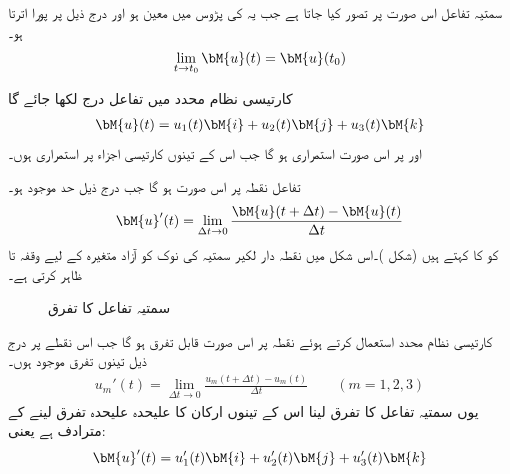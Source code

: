 سمتیہ  تفاعل  اس صورت  پر  تصور کیا جاتا ہے جب یہ  کی پڑوس میں معین ہو اور درج ذیل پر پورا اترتا ہو۔
\begin{align}
\lim_{t\to t_0} \bM{u}(t)=\bM{u}(t_0)
\end{align}

کارتیسی نظام محدد میں تفاعل  درج لکھا جائے گا
\begin{align}
\bM{u}(t)=u_1(t)\bM{i}+u_2(t)\bM{j}+u_3(t)\bM{k}
\end{align}
اور  پر  اس صورت استمراری ہو گا جب اس کے تینوں کارتیسی اجزاء  پر استمراری ہوں۔

تفاعل  نقطہ  پر اس صورت  ہو گا جب  درج ذیل حد موجود ہو۔
\begin{align}
\bM{u}'(t)=\lim_{\Delta t\to 0} \frac{\bM{u}(t+\Delta t)-\bM{u}(t)}{\Delta t}
\end{align}
 کو  کا  کہتے ہیں (شکل )۔اس شکل  میں نقطہ دار لکیر سمتیہ  کی نوک کو  آزاد متغیرہ  کے لیے وقفہ     تا  ظاہر کرتی ہے۔
\begin{figure}
\centering
{}
\caption{سمتیہ  تفاعل کا تفرق}
\label{شکل_الاحصاء_سمتی_تفاعل_تفرق}
\end{figure}

کارتیسی نظام محدد استعمال کرتے ہوئے نقطہ   پر  اس صورت قابل تفرق ہو گا جب اس نقطے پر درج ذیل تینوں تفرق موجود ہوں۔
\begin{align*}
u_m'(t)=\lim_{\Delta t\to 0}\frac{u_m(t+\Delta t)-u_m(t)}{\Delta t} \quad \quad (m=1,2,3)
\end{align*}
یوں سمتیہ تفاعل کا تفرق لینا اس کے تینوں ارکان کا علیحدہ علیحدہ تفرق لینے کے مترادف ہے یعنی:
\begin{align}
\bM{u}'(t)=u_1'(t)\bM{i}+u_2'(t)\bM{j}+u_3'(t)\bM{k}
\end{align}

